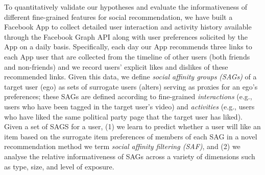 To quantitatively validate our hypotheses and evaluate the
informativeness of different fine-grained features for social
recommendation, we have built a Facebook App to collect detailed user
interaction and activity history available through the Facebook Graph
API along with user preferences solicited by the App on a daily basis.
Specifically, each day our App recommends three links to each App user
that are collected from the timeline of other users (both friends and
non-friends) and we record users' explicit likes and dislikes of these
recommended links.  Given this data, we define \emph{social affinity
groups (SAGs)} of a target user (ego) as sets of surrogate users
(alters) serving as proxies for an ego's preferences; these SAGs are
defined according to fine-grained
\emph{interactions} (e.g., users who have been tagged in the target user's
video) and \emph{activities} (e.g., users who have liked the same
political party page that the target user has liked).  Given a set of
SAGS for a user, (1) we learn to predict whether a user will like an
item based on the surrogate item preferences of members of each SAG in
a novel recommendation method we term {\em social affinity filtering
(SAF)}, and (2) we analyse the relative informativeness of SAGs across
a variety of dimensions such as type, size, and level of exposure.

